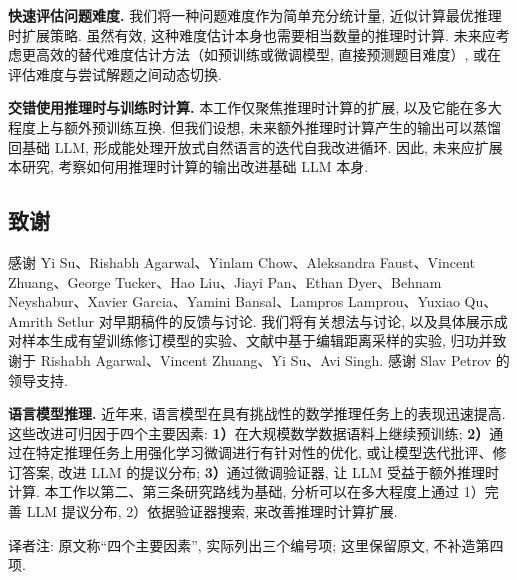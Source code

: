 \textbf{快速评估问题难度. }我们将一种问题难度作为简单充分统计量, 近似计算最优推理时扩展策略. 虽然有效, 这种难度估计本身也需要相当数量的推理时计算. 未来应考虑更高效的替代难度估计方法（如预训练或微调模型, 直接预测题目难度）, 或在评估难度与尝试解题之间动态切换. 

\textbf{交错使用推理时与训练时计算. }本工作仅聚焦推理时计算的扩展, 以及它能在多大程度上与额外预训练互换. 但我们设想, 未来额外推理时计算产生的输出可以蒸馏回基础 LLM, 形成能处理开放式自然语言的迭代自我改进循环. 因此, 未来应扩展本研究, 考察如何用推理时计算的输出改进基础 LLM 本身. 

\subsection*{致谢}
\label{testcompute-acknowledgements}
感谢 Yi Su、Rishabh Agarwal、Yinlam Chow、Aleksandra Faust、Vincent Zhuang、George Tucker、Hao Liu、Jiayi Pan、Ethan Dyer、Behnam Neyshabur、Xavier Garcia、Yamini Bansal、Lampros Lamprou、Yuxiao Qu、Amrith Setlur 对早期稿件的反馈与讨论. 我们将有关想法与讨论, 以及具体展示成对样本生成有望训练修订模型的实验、文献\cite{testcompute-anonymousrevisions}中基于编辑距离采样的实验, 归功并致谢于 Rishabh Agarwal、Vincent Zhuang、Yi Su、Avi Singh. 感谢 Slav Petrov 的领导支持. 



\textbf{语言模型推理. }近年来, 语言模型在具有挑战性的数学推理任务上的表现迅速提高\cite{testcompute-lewkowycz2022solving,testcompute-geminiteam2024gemini,testcompute-openai2024gpt4,testcompute-shao2024deepseekmath,testcompute-lightman2023lets}. 这些改进可归因于四个主要因素: \textbf{1）}在大规模数学数据语料上继续预训练\cite{testcompute-lewkowycz2022solving,testcompute-geminiteam2024gemini,testcompute-shao2024deepseekmath,testcompute-lightman2023lets}; \textbf{2）}通过在特定推理任务上用强化学习微调进行有针对性的优化\cite{testcompute-singh2024human,testcompute-zelikman2022star,testcompute-shao2024deepseekmath,testcompute-yuan2023scaling}, 或让模型迭代批评、修订答案\cite{testcompute-bai2022constitutional,testcompute-madaan2023selfrefine,testcompute-du2023improving,testcompute-saunders2022selfcritiquing}, 改进 LLM 的提议分布; \textbf{3）}通过微调验证器, 让 LLM 受益于额外推理时计算\cite{testcompute-lightman2023lets,testcompute-cobbe2021training,testcompute-uesato2022solving,testcompute-wang2023mathshepherd,testcompute-yao2023tree,testcompute-feng2024alphazerolike,testcompute-chen2024alphamath,testcompute-tian2024selfimprovement}. 本工作以第二、第三条研究路线为基础, 分析可以在多大程度上通过 1）完善 LLM 提议分布, 2）依据验证器搜索, 来改善推理时计算扩展. 
\begin{remark}
译者注: 原文称“四个主要因素”, 实际列出三个编号项; 这里保留原文, 不补造第四项. 
\end{remark}

